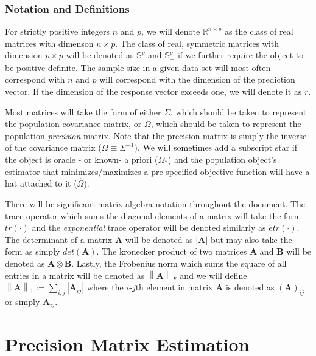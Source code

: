 \documentclass[11pt,]{report}
\begin{document}
\hypertarget{notation-and-definitions}{%
\subsection{Notation and Definitions}\label{notation-and-definitions}}

For strictly positive integers \(n\) and \(p\), we will denote \(\mathbb{R}^{n \times p}\) as the class of real matrices with dimenson \(n \times p\). The class of real, symmetric matrices with dimension \(p \times p\) will be denoted as \(\mathbb{S}^{p}\) and \(\mathbb{S}^{p}_{+}\) if we further require the object to be positive definite. The sample size in a given data set will most often correspond with \(n\) and \(p\) will correspond with the dimension of the prediction vector. If the dimension of the response vector exceeds one, we will denote it as \(r\).

Most matrices will take the form of either \(\Sigma\), which should be taken to represent the population covariance matrix, or \(\Omega\), which should be taken to represent the population \emph{precision} matrix. Note that the precision matrix is simply the inverse of the covariance matrix (\(\Omega \equiv \Sigma^{-1}\)). We will sometimes add a subscript star if the object is oracle - or known- a priori (\(\Omega_{*}\)) and the population object's estimator that minimizes/maximizes a pre-specified objective function will have a hat attached to it (\(\hat{\Omega}\)).

There will be significant matrix algebra notation throughout the document. The trace operator which sums the diagonal elements of a matrix will take the form \(tr\left(\cdot\right)\) and the \emph{exponential} trace operator will be denoted similarly as \(etr\left(\cdot\right)\). The determinant of a matrix \(\mathbf{A}\) will be denoted as \(\left|\mathbf{A}\right|\) but may also take the form as simply \(det\left(\mathbf{A}\right)\). The kronecker product of two matrices \(\mathbf{A}\) and \(\mathbf{B}\) will be denoted as \(\mathbf{A} \otimes \mathbf{B}\). Lastly, the Frobenius norm which sums the square of all entries in a matrix will be denoted as \(\left\|\mathbf{A}\right\|_{F}\) and we will define \(\left\|\mathbf{A}\right\|_{1} := \sum_{i, j}\left|\mathbf{A}_{ij}\right|\) where the \(i\)-\(j\)th element in matrix \(\mathbf{A}\) is denoted as \(\left(\mathbf{A}\right)_{ij}\) or simply \(\mathbf{A}_{ij}\).

\hypertarget{precision-matrix-estimation}{%
\chapter{Precision Matrix Estimation}\label{precision-matrix-estimation}}
\end{document}
